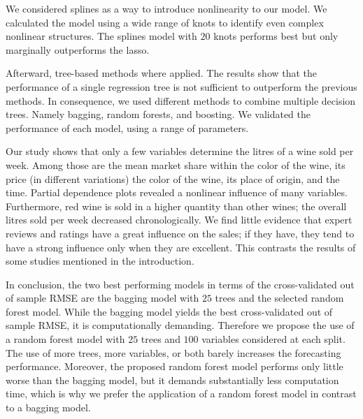 \documentclass[11pt,]{article}
\begin{document}
We considered splines as a way to introduce nonlinearity to our model.
We calculated the model using a wide range of knots to identify even
complex nonlinear structures. The splines model with \(20\) knots
performs best but only marginally outperforms the \ac{lasso}.

Afterward, tree-based methods where applied. The results show that the
performance of a single regression tree is not sufficient to outperform
the previous methods. In consequence, we used different methods to
combine multiple decision trees. Namely bagging, random forests, and
boosting. We validated the performance of each model, using a range of
parameters.

Our study shows that only a few variables determine the litres of a wine
sold per week. Among those are the mean market share within the color of
the wine, its price (in different variations) the color of the wine, its
place of origin, and the time. Partial dependence plots revealed a
nonlinear influence of many variables. Furthermore, red wine is sold in
a higher quantity than other wines; the overall litres sold per week
decreased chronologically. We find little evidence that expert reviews
and ratings have a great influence on the sales; if they have, they tend
to have a strong influence only when they are excellent. This contrasts
the results of some studies mentioned in the introduction.

In conclusion, the two best performing models in terms of the
cross-validated out of sample \ac{RMSE} are the bagging model with
\(25\) trees and the selected random forest model. While the bagging
model yields the best cross-validated out of sample \ac{RMSE}, it is
computationally demanding. Therefore we propose the use of a random
forest model with \(25\) trees and \(100\) variables considered at each
split. The use of more trees, more variables, or both barely increases
the forecasting performance. Moreover, the proposed random forest model
performs only little worse than the \ac{bagging} model, but it demands
substantially less computation time, which is why we prefer the
application of a random forest model in contrast to a bagging model.

\pagebreak

\printbibliography[title = References]
\cleardoublepage

\begin{refsection}
\nocite{R-base}
\nocite{R-stargazer}
\nocite{R-stringr}
\nocite{R-tidyr}
\nocite{R-dplyr}
\nocite{R-glmnet}
\nocite{R-class}
\nocite{R-MASS}
\nocite{R-plm}
\nocite{R-leaps}
\nocite{R-caret}
\nocite{R-tree}
\nocite{R-gbm}
\nocite{R-plotmo}
\nocite{R-pls}
\nocite{R-splines}
\nocite{R-tictoc}
\nocite{R-plotly}
\nocite{R-inspectdf}
\nocite{R-rpart}
\nocite{R-rpart.plot}
\nocite{R-stargazer}
\nocite{R-knitr}
\nocite{R-purrr}
\nocite{R-randomForest}
\nocite{R-rstudioapi}





\nocite{R-Studio}

\printbibliography[title = Software-References]
\end{refsection}
\end{document}
